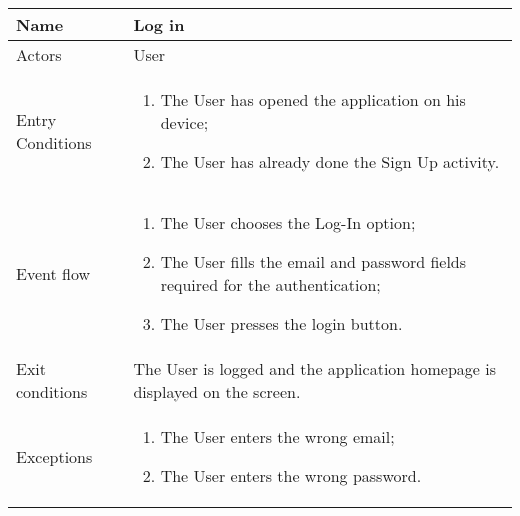 \begin{table}[H]
  \centering
  \begin{tabularx}{\textwidth}{ |l|X| }
    \hline
    Name & Log in\\
    \hline
    Actors & User\\
    \hline
    Entry Conditions & \begin{enumerate}[noitemsep]
                        \item The User has opened the application on his device;
                        \item The User has already done the Sign Up activity.
                      \end{enumerate}\\
    \hline
    Event flow & \begin{enumerate}[noitemsep]
                    \item The User chooses the Log-In  option;
                    \item The User fills the email and password fields required for the authentication;
                    \item The User presses the login button.
                \end{enumerate}\\
    \hline
    Exit conditions & The User is logged and the application homepage is displayed on the screen.\\
    \hline
    Exceptions & \begin{enumerate}[noitemsep]
                  \item The User enters the wrong email;
                  \item The User enters the wrong password.
                \end{enumerate}\\
    \hline
  \end{tabularx}
\end{table}

